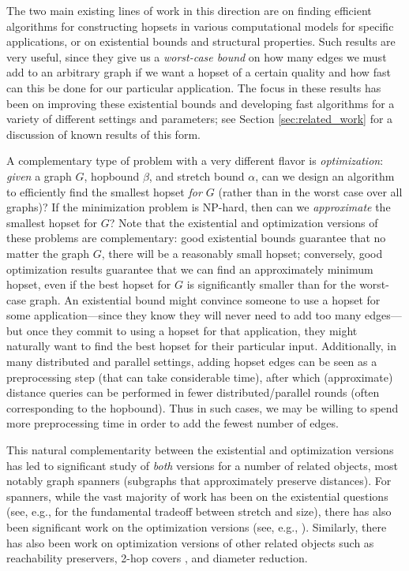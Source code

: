 \documentclass{article}
\theoremstyle{definition}
\theoremstyle{remark}
\begin{document}
The two main existing lines of work in this direction are on finding efficient algorithms for constructing hopsets in various computational models for specific applications, or on existential bounds and structural properties.
Such results are very useful, since they give us a \emph{worst-case bound} on how many edges we must add to an arbitrary graph if we want a hopset of a certain quality and how fast can this be done for our particular application.  The focus in these results has been on improving these existential bounds and developing fast algorithms for a variety of different settings and parameters; see Section \ref{sec:related_work} for a discussion of known results of this form.

A complementary type of problem with a very different flavor is \emph{optimization}: \emph{given} a graph $G$, hopbound $\beta$, and stretch bound $\alpha$, can we design an algorithm to efficiently find the smallest hopset \emph{for $G$} (rather than in the worst case over all graphs)?  If the minimization problem is NP-hard, then can we \emph{approximate} the smallest hopset for $G$?  Note that the existential and optimization versions of these problems are complementary: good existential bounds guarantee that no matter the graph $G$, there will be a reasonably small hopset; conversely, good optimization results guarantee that we can find an approximately minimum hopset, even if the best hopset for $G$ is significantly smaller than for the worst-case graph.  An existential bound might convince someone to use a hopset for some application---since they know they will never need to add too many edges---but once they commit to using a hopset for that application, they might naturally want to find the best hopset for their particular input. Additionally, in many distributed and parallel settings, adding hopset edges can be seen as a preprocessing step (that can take considerable time), after which (approximate) distance queries can be performed in fewer distributed/parallel rounds (often corresponding to the hopbound). Thus in such cases, we may be willing to spend more preprocessing time in order to add the fewest number of edges.

This natural complementarity between the existential and optimization versions has led to significant study of \emph{both} versions for a number of related objects, most notably graph spanners (subgraphs that approximately preserve distances).  For spanners, while the vast majority of work has been on the existential questions (see, e.g., \cite{ADDJS93} for the fundamental tradeoff between stretch and size), there has also been significant work on the optimization versions (see, e.g., \cite{KP94,KP98,Kor01,EP07,DK11,BBMRY11,DKR16,DNZ20,GKL23,CD16,CDKL20,GLQ21,CDK12,CDR19}).  Similarly, there has also been work on optimization versions of other related objects such as reachability preservers\cite{abboud2024reachability}, 2-hop covers \cite{CHHZ2003}, and diameter reduction\cite{demaine2010minimizing}.
\end{document}
